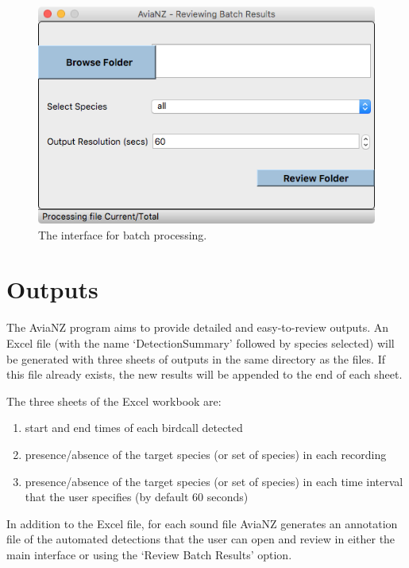 \documentclass{article}
\begin{document}
\begin{figure}[h!]
\centering
\includegraphics[width=.5\textwidth]{Figs/batchreview}
\caption{The interface for batch processing.}
\label{batch2}
\end{figure}

\section{Outputs}
\label{sec:outputs}
The AviaNZ program aims to provide detailed and easy-to-review outputs. An Excel file (with the name `DetectionSummary' followed by species selected) will be generated with three sheets of outputs in the same directory as the files. If this file already exists, the new results will be appended to the end of each sheet. 

The three sheets of the Excel workbook are:

\begin{enumerate}
\item start and end times of each birdcall detected
\item presence/absence of the target species (or set of species) in each recording
\item  presence/absence of the target species (or set of species) in each time interval that the user specifies (by default 60 seconds)
\end{enumerate}

In addition to the Excel file, for each sound file AviaNZ generates an annotation file of the automated detections that  the user can open and review in either the main interface or using the `Review Batch Results' option. 
\end{document}
